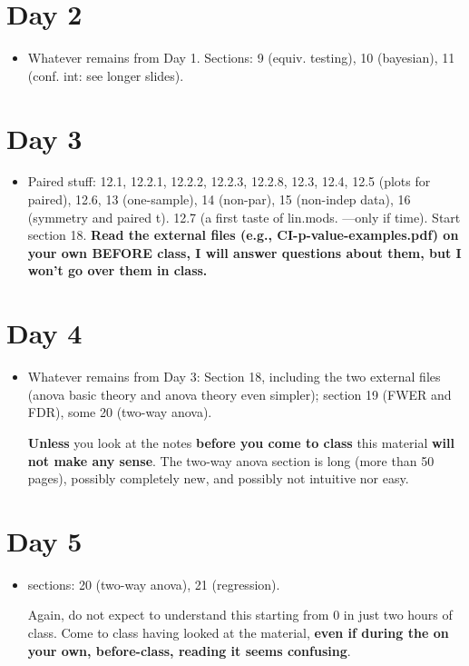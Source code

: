 \documentclass[12pt]{article}
\begin{document}
\section*{Day 2}
\label{sec:org5a4c730}
\begin{itemize}
\item Whatever remains from Day 1. Sections: 9 (equiv. testing), 10 (bayesian), 11 (conf. int: see longer slides).
\end{itemize}
\section*{Day 3}
\label{sec:org609aabb}
\begin{itemize}
\item Paired stuff: 12.1, 12.2.1, 12.2.2, 12.2.3, 12.2.8, 12.3, 12.4, 12.5 (plots for paired), 12.6, 13 (one-sample), 14 (non-par), 15 (non-indep data), 16 (symmetry and paired t). 12.7 (a first taste of lin.mods. ---only if time). Start section 18. \textbf{Read the external files (e.g., CI-p-value-examples.pdf) on your own BEFORE class, I will answer questions about them, but I won't go over them in class.}
\end{itemize}
\section*{Day 4 }
\label{sec:org394fbf9}
\begin{itemize}
\item Whatever remains from Day 3: Section 18, including the two external files (anova basic theory and anova theory even simpler); section 19 (FWER and FDR), some 20 (two-way anova). %

   \textbf{Unless} you look at the notes \textbf{before you come to class} this material \textbf{will not make any sense}. The two-way anova section is long (more than 50 pages), possibly completely new, and possibly not intuitive nor easy.

\end{itemize}
\section*{Day 5 }
\label{sec:orgcb0a12f}
\begin{itemize}
\item sections: 20 (two-way anova), 21 (regression).


  Again, do not expect to understand this starting from 0 in just two hours of class. Come to class having looked at the material, \textbf{even if during the on your own, before-class, reading it seems confusing}.

\end{itemize}
\end{document}
